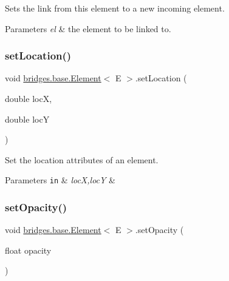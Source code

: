 Sets the link from this element to a new incoming element. 


\begin{DoxyParams}{Parameters}
{\em el} & the element to be linked to. \\
\hline
\end{DoxyParams}
\mbox{\label{classbridges_1_1base_1_1_element_a0fe9a52d06e8f3ccc8521e155ec72a27}} 
\subsubsection{\texorpdfstring{set\+Location()}{setLocation()}}
{\footnotesize\ttfamily void \hyperlink{classbridges_1_1base_1_1_element}{bridges.\+base.\+Element}$<$ E $>$.set\+Location (\begin{DoxyParamCaption}\item[{double}]{locX,  }\item[{double}]{locY }\end{DoxyParamCaption})}



Set the location attributes of an element. 


\begin{DoxyParams}[1]{Parameters}
\mbox{\tt in}  & {\em locX,locY} & \\
\hline
\end{DoxyParams}
\mbox{\label{classbridges_1_1base_1_1_element_a71c622f2cbb03b086c5a8f80d390b366}} 
\subsubsection{\texorpdfstring{set\+Opacity()}{setOpacity()}}
{\footnotesize\ttfamily void \hyperlink{classbridges_1_1base_1_1_element}{bridges.\+base.\+Element}$<$ E $>$.set\+Opacity (\begin{DoxyParamCaption}\item[{float}]{opacity }\end{DoxyParamCaption})}

